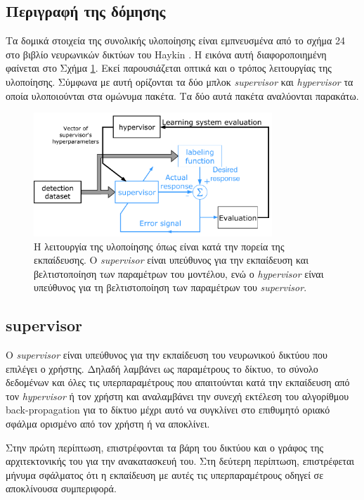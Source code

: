 \subsection{Περιγραφή της δόμησης}
Τα δομικά στοιχεία της συνολικής υλοποίησης είναι εμπνευσμένα από το σχήμα 24 στο βιβλίο νευρωνικών δικτύων του Haykin \cite{66}. Η εικόνα αυτή διαφοροποιημένη φαίνεται στο Σχήμα \ref{fig:haykin_figure}. Εκεί παρουσιάζεται οπτικά και ο τρόπος λειτουργίας της υλοποίησης. Σύμφωνα με αυτή ορίζονται τα δύο μπλοκ \textit{supervisor} και \textit{hypervisor} τα οποία υλοποιούνται στα ομώνυμα πακέτα. Τα δύο αυτά πακέτα αναλύονται παρακάτω.

\begin{figure}
    \centering
    \includegraphics[width = 0.8\textwidth]{figures/architecture/haykin_figure.pdf}
    \caption[Η λειτουργία της υλοποίησης]{Η λειτουργία της υλοποίησης όπως είναι κατά την πορεία της εκπαίδευσης. Ο \textit{supervisor} είναι υπεύθυνος για την εκπαίδευση και βελτιστοποίηση των παραμέτρων του μοντέλου, ενώ ο \textit{hypervisor} είναι υπεύθυνος για τη βελτιστοποίηση των παραμέτρων του \textit{supervisor}.}
    \label{fig:haykin_figure}
\end{figure}

\subsection{supervisor}
Ο \textit{supervisor} είναι υπεύθυνος για την εκπαίδευση του νευρωνικού δικτύου που επιλέγει ο χρήστης. Δηλαδή λαμβάνει ως παραμέτρους το δίκτυο, το σύνολο δεδομένων και όλες τις υπερπαραμέτρους που απαιτούνται κατά την εκπαίδευση από τον \textit{hypervisor} ή τον χρήστη και αναλαμβάνει την συνεχή εκτέλεση του αλγορίθμου back-propagation για το δίκτυο μέχρι αυτό να συγκλίνει στο επιθυμητό οριακό σφάλμα ορισμένο από τον χρήστη ή να αποκλίνει.

Στην πρώτη περίπτωση, επιστρέφονται τα βάρη του δικτύου και ο γράφος της αρχιτεκτονικής του για την ανακατασκευή του. Στη δεύτερη περίπτωση, επιστρέφεται μήνυμα σφάλματος ότι η εκπαίδευση με αυτές τις υπερπαραμέτρους οδηγεί σε αποκλίνουσα συμπεριφορά.


